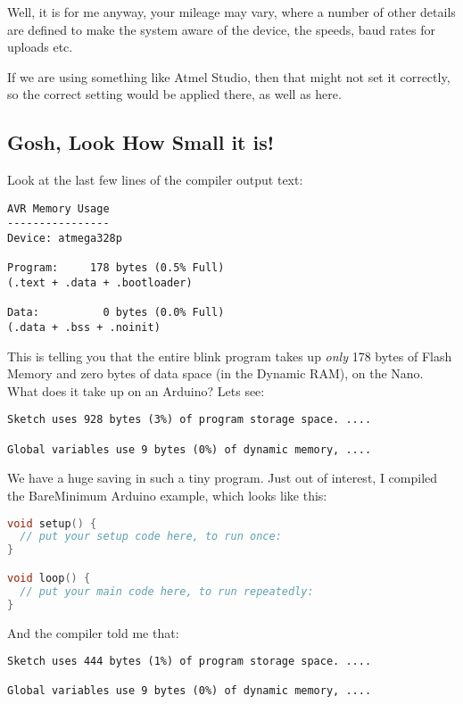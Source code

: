 Well, it is for me anyway, your mileage may vary, where a number of other details are defined
to make the system aware of the device, the speeds, baud rates for uploads etc.

If we are using something like Atmel Studio, then that might not set it correctly, so the correct setting would be applied there, as well as here.

\subsection{Gosh, Look How Small it
is!}\label{gosh-look-how-small-it-is}

Look at the last few lines of the compiler output text:

\begin{lstlisting}[firstnumber=14]
AVR Memory Usage
----------------
Device: atmega328p

Program:     178 bytes (0.5% Full)
(.text + .data + .bootloader)

Data:          0 bytes (0.0% Full)
(.data + .bss + .noinit)
\end{lstlisting}

This is telling you that the entire blink program takes up \emph{only}
178 bytes of Flash Memory and zero bytes of data space (in the Dynamic
RAM), on the Nano. What does it take up on an Arduino? Lets see:

\begin{lstlisting}
Sketch uses 928 bytes (3%) of program storage space. ....

Global variables use 9 bytes (0%) of dynamic memory, ....
\end{lstlisting}

We have a huge saving in such a tiny program. Just out of interest, I
compiled the BareMinimum Arduino example, which looks like this:

\begin{lstlisting}[language=C]
void setup() {
  // put your setup code here, to run once:
}

void loop() {
  // put your main code here, to run repeatedly:
}
\end{lstlisting}

And the compiler told me that:

\begin{lstlisting}
Sketch uses 444 bytes (1%) of program storage space. ....

Global variables use 9 bytes (0%) of dynamic memory, ....
\end{lstlisting}

